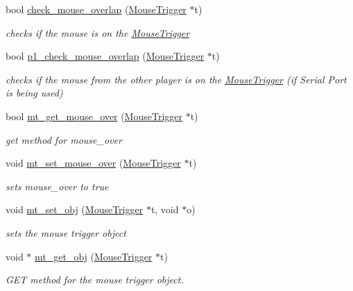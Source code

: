 \begin{DoxyCompactItemize}
bool \hyperlink{group__MouseTrigger_ga2cc2cd6834ca21e5346ed3bcc29607bb}{check\+\_\+mouse\+\_\+overlap} (\hyperlink{structMouseTrigger}{Mouse\+Trigger} $\ast$t)
\begin{DoxyCompactList}\small\item\em checks if the mouse is on the \hyperlink{structMouseTrigger}{Mouse\+Trigger} \end{DoxyCompactList}\item 
bool \hyperlink{group__MouseTrigger_gac606d27355408b95dbf9f4569003a6de}{p1\+\_\+check\+\_\+mouse\+\_\+overlap} (\hyperlink{structMouseTrigger}{Mouse\+Trigger} $\ast$t)
\begin{DoxyCompactList}\small\item\em checks if the mouse from the other player is on the \hyperlink{structMouseTrigger}{Mouse\+Trigger} (if Serial Port is being used) \end{DoxyCompactList}\item 
bool \hyperlink{group__MouseTrigger_ga2a065a926bc0f7b36fa31a8d4121b740}{mt\+\_\+get\+\_\+mouse\+\_\+over} (\hyperlink{structMouseTrigger}{Mouse\+Trigger} $\ast$t)
\begin{DoxyCompactList}\small\item\em get method for mouse\+\_\+over \end{DoxyCompactList}\item 
void \hyperlink{group__MouseTrigger_gaafa2c957090b2e1b477ed2497702b7b7}{mt\+\_\+set\+\_\+mouse\+\_\+over} (\hyperlink{structMouseTrigger}{Mouse\+Trigger} $\ast$t)
\begin{DoxyCompactList}\small\item\em sets mouse\+\_\+over to true \end{DoxyCompactList}\item 
void \hyperlink{group__MouseTrigger_gab77507c5d9854b7626b4dfe6b457e5b5}{mt\+\_\+set\+\_\+obj} (\hyperlink{structMouseTrigger}{Mouse\+Trigger} $\ast$t, void $\ast$o)
\begin{DoxyCompactList}\small\item\em sets the mouse trigger object \end{DoxyCompactList}\item 
void $\ast$ \hyperlink{group__MouseTrigger_gadb5e029956ef7cda8029a690f7a8bbbb}{mt\+\_\+get\+\_\+obj} (\hyperlink{structMouseTrigger}{Mouse\+Trigger} $\ast$t)
\begin{DoxyCompactList}\small\item\em G\+ET method for the mouse trigger object. \end{DoxyCompactList}\end{DoxyCompactItemize}


